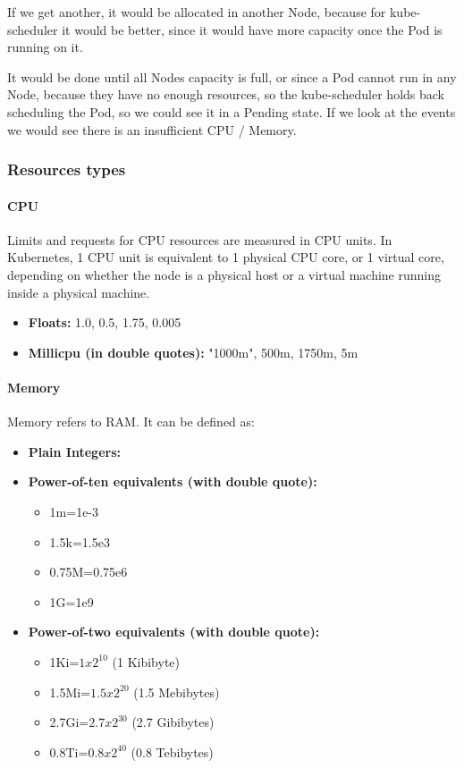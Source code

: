 \documentclass{article}
\begin{document}
If we get another, it would be allocated in another Node, because for kube-scheduler it would be better, since it would have more capacity once the Pod is running on it.

It would be done until all Nodes capacity is full, or since a Pod cannot run in any Node, because they have no enough resources, so the kube-scheduler holds back scheduling the Pod, so we could see it in a Pending state. If we look at the events we would see there is an insufficient CPU / Memory.

\subsubsection{Resources types}
\paragraph{CPU}

Limits and requests for CPU resources are measured in CPU units. In Kubernetes, 1 CPU unit is equivalent to 1 physical CPU core, or 1 virtual core, depending on whether the node is a physical host or a virtual machine running inside a physical machine.
\begin{itemize}
    \item \textbf{Floats:} 1.0, 0.5, 1.75, 0.005
     \item \textbf{Millicpu (in double quotes):} "1000m", 500m, 1750m, 5m
\end{itemize}

\paragraph{Memory}

Memory refers to RAM. It can be defined as:
\begin{itemize}
    \item \textbf{Plain Integers:}
    \item \textbf{Power-of-ten equivalents (with double quote):}
    \begin{itemize}
        \item 1m=1e-3
        \item 1.5k=1.5e3
        \item 0.75M=0.75e6
        \item 1G=1e9
    \end{itemize}
    \item \textbf{Power-of-two equivalents (with double quote):}
    \begin{itemize}
        \item 1Ki=$1x2^{10}$ (1 Kibibyte)
        \item 1.5Mi=$1.5x2^{20}$ (1.5 Mebibytes)
        \item 2.7Gi=$2.7x2^{30}$ (2.7 Gibibytes)
        \item 0.8Ti=$0.8x2^{40}$ (0.8 Tebibytes)
    \end{itemize}
\end{itemize}
\end{document}
